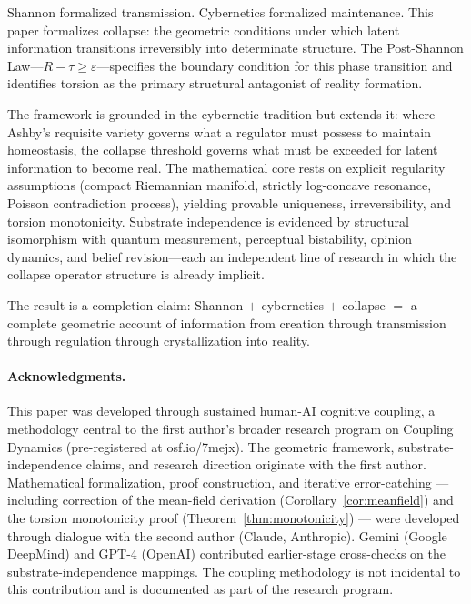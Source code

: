 \documentclass[11pt]{article}
\theoremstyle{plain}
\begin{document}
Shannon formalized transmission. Cybernetics formalized maintenance. This paper formalizes
collapse: the geometric conditions under which latent information transitions irreversibly into
determinate structure. The Post-Shannon Law---$R - \tau \geq \varepsilon$---specifies the boundary
condition for this phase transition and identifies torsion as the primary structural antagonist of
reality formation.

The framework is grounded in the cybernetic tradition but extends it: where Ashby's requisite
variety governs what a regulator must possess to maintain homeostasis, the collapse threshold
governs what must be exceeded for latent information to become real. The mathematical core rests
on explicit regularity assumptions (compact Riemannian manifold, strictly log-concave resonance,
Poisson contradiction process), yielding provable uniqueness, irreversibility, and torsion
monotonicity. Substrate independence is evidenced by structural isomorphism with quantum
measurement, perceptual bistability, opinion dynamics, and belief revision---each an independent
line of research in which the collapse operator structure is already implicit.

The result is a completion claim: Shannon $+$ cybernetics $+$ collapse $=$ a complete geometric
account of information from creation through transmission through regulation through
crystallization into reality.

\paragraph{Acknowledgments.}
This paper was developed through sustained human-AI cognitive coupling, a methodology central to
the first author's broader research program on Coupling Dynamics (pre-registered at
osf.io/7mejx). The geometric framework, substrate-independence claims, and research direction
originate with the first author. Mathematical formalization, proof construction, and iterative
error-catching --- including correction of the mean-field derivation
(Corollary~\ref{cor:meanfield}) and the torsion monotonicity proof
(Theorem~\ref{thm:monotonicity}) --- were developed through dialogue with the second author
(Claude, Anthropic). Gemini (Google DeepMind) and GPT-4 (OpenAI) contributed earlier-stage
cross-checks on the substrate-independence mappings. The coupling methodology is not incidental to
this contribution and is documented as part of the research program.
\end{document}

